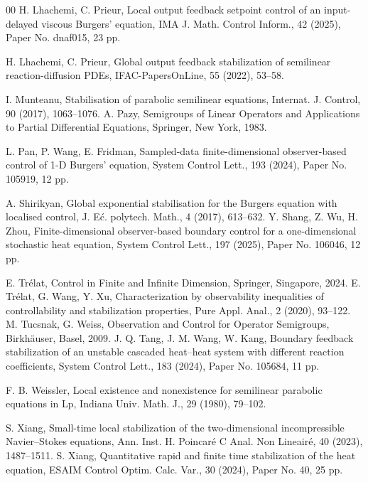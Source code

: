 \documentclass[review]{elsarticle}
\numberwithin{equation}{section}
\begin{document}
\begin{thebibliography}{00}
H. Lhachemi, C. Prieur, Local output feedback setpoint control of an input-delayed viscous Burgers’ equation, IMA J. Math. Control Inform., 42 (2025), Paper No. dnaf015, 23 pp.

H. Lhachemi, C. Prieur, Global output feedback stabilization of semilinear reaction-diffusion PDEs, IFAC-PapersOnLine, 55 (2022), 53–58.

I. Munteanu, Stabilisation of parabolic semilinear equations, Internat. J. Control, 90 (2017), 1063–1076.
A. Pazy, Semigroups of Linear Operators and Applications to Partial Differential Equations, Springer, New York, 1983.

L. Pan, P. Wang, E. Fridman, Sampled-data finite-dimensional observer-based control of 1-D Burgers’ equation, System Control Lett., 193 (2024), Paper No. 105919, 12 pp.

A. Shirikyan, Global exponential stabilisation for the Burgers equation with localised control, J. E\'c. polytech. Math., 4 (2017), 613–632.
Y. Shang, Z. Wu, H. Zhou, Finite-dimensional observer-based boundary control for a one-dimensional stochastic heat equation, System Control Lett., 197 (2025), Paper No. 106046, 12 pp.

E. Trélat, Control in Finite and Infinite Dimension, Springer, Singapore, 2024.
E. Tr\'elat, G. Wang, Y. Xu, Characterization by observability inequalities of controllability and stabilization properties, Pure Appl. Anal., 2 (2020), 93–122.
M. Tucsnak, G. Weiss, Observation and Control for Operator Semigroups, Birkhäuser, Basel, 2009.
J. Q. Tang, J. M. Wang, W. Kang, Boundary feedback stabilization of an unstable cascaded heat–heat system with different reaction coefficients, System Control Lett., 183 (2024), Paper No. 105684, 11 pp.

F. B. Weissler, Local existence and nonexistence for semilinear parabolic equations in Lp, Indiana Univ. Math. J., 29 (1980), 79–102.

S. Xiang, Small-time local stabilization of the two-dimensional incompressible Navier–Stokes equations, Ann. Inst. H. Poincar\'e C Anal. Non Lineair\'e, 40 (2023), 1487–1511.
S. Xiang, Quantitative rapid and finite time stabilization of the heat equation, ESAIM Control Optim. Calc. Var., 30 (2024), Paper No. 40, 25 pp.

\end{thebibliography}
\end{document}
